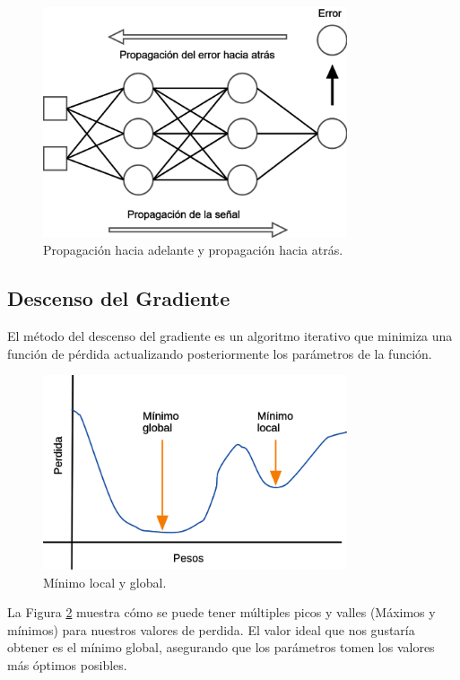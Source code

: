\begin{figure}[H]
    \centering
    \includegraphics[width=0.8\textwidth]{MarcoTeorico/imgs/Backpropagation.png}
    \caption{Propagación hacia adelante y propagación hacia atrás.}
    \label{fig:backpropagation}
\end{figure}

\subsection{Descenso del Gradiente }

El método del descenso del gradiente es un algoritmo iterativo que minimiza una función de pérdida actualizando posteriormente los parámetros de la función.

\begin{figure}[H]
    \centering
    \includegraphics[width=0.8\textwidth]{MarcoTeorico/imgs/DescensoGradiente.png}
    \caption{Mínimo local y global.}
    \label{fig:descensoGradiente}
\end{figure}

La Figura \ref{fig:descensoGradiente} muestra cómo se puede tener múltiples picos y valles (Máximos y mínimos) para nuestros valores de perdida. El valor ideal que nos gustaría obtener es el mínimo global, asegurando que los parámetros tomen los valores más óptimos posibles.

